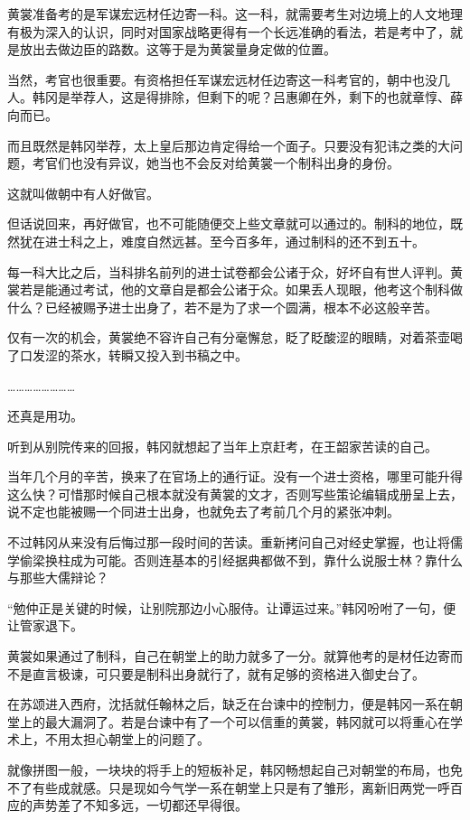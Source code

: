 黄裳准备考的是军谋宏远材任边寄一科。这一科，就需要考生对边境上的人文地理有极为深入的认识，同时对国家战略更得有一个长远准确的看法，若是考中了，就是放出去做边臣的路数。这等于是为黄裳量身定做的位置。

当然，考官也很重要。有资格担任军谋宏远材任边寄这一科考官的，朝中也没几人。韩冈是举荐人，这是得排除，但剩下的呢？吕惠卿在外，剩下的也就章惇、薛向而已。

而且既然是韩冈举荐，太上皇后那边肯定得给一个面子。只要没有犯讳之类的大问题，考官们也没有异议，她当也不会反对给黄裳一个制科出身的身份。

这就叫做朝中有人好做官。

但话说回来，再好做官，也不可能随便交上些文章就可以通过的。制科的地位，既然犹在进士科之上，难度自然远甚。至今百多年，通过制科的还不到五十。

每一科大比之后，当科排名前列的进士试卷都会公诸于众，好坏自有世人评判。黄裳若是能通过考试，他的文章自是都会公诸于众。如果丢人现眼，他考这个制科做什么？已经被赐予进士出身了，若不是为了求一个圆满，根本不必这般辛苦。

仅有一次的机会，黄裳绝不容许自己有分毫懈怠，眨了眨酸涩的眼睛，对着茶壶喝了口发涩的茶水，转瞬又投入到书稿之中。

……………………

还真是用功。

听到从别院传来的回报，韩冈就想起了当年上京赶考，在王韶家苦读的自己。

当年几个月的辛苦，换来了在官场上的通行证。没有一个进士资格，哪里可能升得这么快？可惜那时候自己根本就没有黄裳的文才，否则写些策论编辑成册呈上去，说不定也能被赐一个同进士出身，也就免去了考前几个月的紧张冲刺。

不过韩冈从来没有后悔过那一段时间的苦读。重新拷问自己对经史掌握，也让将儒学偷梁换柱成为可能。否则连基本的引经据典都做不到，靠什么说服士林？靠什么与那些大儒辩论？

“勉仲正是关键的时候，让别院那边小心服侍。让谭运过来。”韩冈吩咐了一句，便让管家退下。

黄裳如果通过了制科，自己在朝堂上的助力就多了一分。就算他考的是材任边寄而不是直言极谏，可只要是制科出身就行了，就有足够的资格进入御史台了。

在苏颂进入西府，沈括就任翰林之后，缺乏在台谏中的控制力，便是韩冈一系在朝堂上的最大漏洞了。若是台谏中有了一个可以信重的黄裳，韩冈就可以将重心在学术上，不用太担心朝堂上的问题了。

就像拼图一般，一块块的将手上的短板补足，韩冈畅想起自己对朝堂的布局，也免不了有些成就感。只是现如今气学一系在朝堂上只是有了雏形，离新旧两党一呼百应的声势差了不知多远，一切都还早得很。

